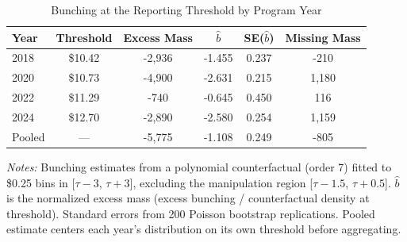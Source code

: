 \begin{table}[t]
\centering
\caption{Bunching at the Reporting Threshold by Program Year}
\label{tab:bunching_year}
\begin{threeparttable}
\begin{tabular}{lccccc}
\toprule
Year & Threshold & Excess Mass & $\hat{b}$ & SE($\hat{b}$) & Missing Mass \\
\midrule
2018 & \$10.42 & -2,936 & -1.455 & 0.237 & -210 \\
2020 & \$10.73 & -4,900 & -2.631 & 0.215 & 1,180 \\
2022 & \$11.29 & -740 & -0.645 & 0.450 & 116 \\
2024 & \$12.70 & -2,890 & -2.580 & 0.254 & 1,159 \\
\midrule
Pooled & --- & -5,775 & -1.108 & 0.249 & -805 \\
\bottomrule
\end{tabular}
\begin{tablenotes}
\item \textit{Notes:} Bunching estimates from a polynomial counterfactual (order 7)
fitted to \$0.25 bins in [$\tau - 3$, $\tau + 3$], excluding the manipulation region
[$\tau - 1.5$, $\tau + 0.5$]. $\hat{b}$ is the normalized excess mass
(excess bunching / counterfactual density at threshold). Standard errors from
200 Poisson bootstrap replications. Pooled estimate centers each year's distribution
on its own threshold before aggregating.
\end{tablenotes}
\end{threeparttable}
\end{table}

